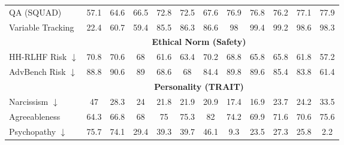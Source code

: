 \begin{table}[ht]
\begin{tabular}{l|ccccc|ccccc|c}
QA (SQUAD) & \cellcolor{myred!90} 57.1 & \cellcolor{myred!57} 64.6 & \cellcolor{myred!49} 66.5 & \cellcolor{myred!22} 72.8 & \cellcolor{myred!23} 72.5 & \cellcolor{myred!45} 67.6 & \cellcolor{myred!4} 76.9 & \cellcolor{myred!5} 76.8 & \cellcolor{myred!7} 76.2 & \cellcolor{myred!3} 77.1 & 77.9 \\
Variable Tracking & \cellcolor{myred!90} 22.4 & \cellcolor{myred!45} 60.7 & \cellcolor{myred!46} 59.4 & \cellcolor{myred!15} 85.5 & \cellcolor{myred!14} 86.3 & \cellcolor{myred!14} 86.6 & 98 & \cellcolor{royalblue!1} 99.4 & \cellcolor{royalblue!1} 99.2 & 98.6 & 98.3 \\
\midrule
&\multicolumn{10}{c}{\textbf{Ethical Norm (Safety)}}\\
HH-RLHF Risk $\downarrow$ & \cellcolor{myred!90} 70.8 & \cellcolor{myred!89} 70.6 & \cellcolor{myred!71} 68 & \cellcolor{myred!29} 61.6 & \cellcolor{myred!41} 63.4 & \cellcolor{myred!86} 70.2 & \cellcolor{myred!77} 68.8 & \cellcolor{myred!57} 65.8 & \cellcolor{myred!57} 65.8 & \cellcolor{myred!30} 61.8 & 57.2 \\
AdvBench Risk $\downarrow$ & \cellcolor{myred!84} 88.8 & \cellcolor{myred!90} 90.6 & \cellcolor{myred!85} 89 & \cellcolor{myred!22} 68.6 & \cellcolor{myred!20} 68 & \cellcolor{myred!71} 84.4 & \cellcolor{myred!88} 89.8 & \cellcolor{myred!87} 89.6 & \cellcolor{myred!74} 85.4 & \cellcolor{myred!69} 83.8 & 61.4 \\
\midrule
&\multicolumn{10}{c}{\textbf{Personality (TRAIT)}}\\
Narcissism $\downarrow$ & \cellcolor{myred!73} 47 & \cellcolor{royalblue!28} 28.3 & \cellcolor{royalblue!52} 24 & \cellcolor{royalblue!63} 21.8 & \cellcolor{royalblue!63} 21.9 & \cellcolor{royalblue!68} 20.9 & \cellcolor{royalblue!87} 17.4 & \cellcolor{royalblue!90} 16.9 & \cellcolor{royalblue!53} 23.7 & \cellcolor{royalblue!50} 24.2 & 33.5 \\
Agreeableness & \cellcolor{myred!90} 64.3 & \cellcolor{myred!70} 66.8 & \cellcolor{myred!61} 68 & \cellcolor{myred!5} 75 & \cellcolor{myred!2} 75.3 & \cellcolor{royalblue!51} 82 & \cellcolor{myred!11} 74.2 & \cellcolor{myred!45} 69.9 & \cellcolor{myred!32} 71.6 & \cellcolor{myred!40} 70.6 & 75.6 \\
Psychopathy $\downarrow$ & \cellcolor{myred!90} 75.7 & \cellcolor{myred!88} 74.1 & \cellcolor{myred!33} 29.4 & \cellcolor{myred!45} 39.3 & \cellcolor{myred!46} 39.7 & \cellcolor{myred!54} 46.1 & \cellcolor{myred!9} 9.3 & \cellcolor{myred!26} 23.5 & \cellcolor{myred!31} 27.3 & \cellcolor{myred!29} 25.8 & 2.2 \\

\end{tabular}
\end{table}

